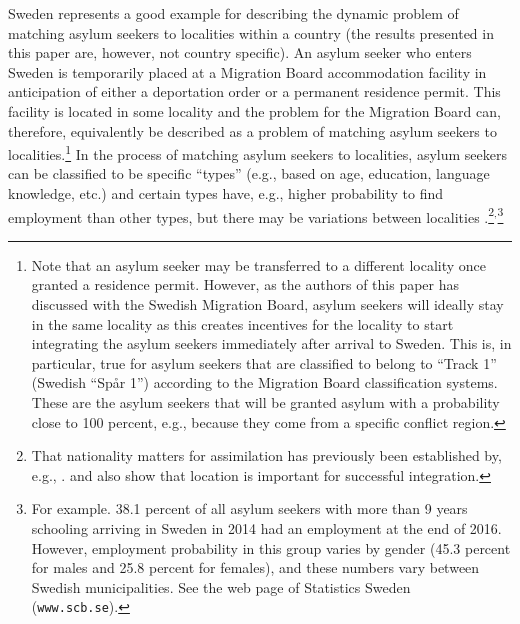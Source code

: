 \documentclass[12pt,fleqn]{article}
\begin{document}
Sweden represents a good example for describing the dynamic problem of matching asylum seekers to localities within a country (the results presented in this paper are, however, not country specific). An asylum seeker who enters Sweden is temporarily placed at a Migration Board accommodation facility in anticipation of either a deportation order or a permanent residence permit. This facility is located in some locality and the problem for the Migration Board can, therefore, equivalently be described as a problem of matching asylum seekers to localities.\footnote{Note that an asylum seeker may be transferred to a different locality once granted a residence permit. However, as the authors of this paper has discussed with the Swedish Migration Board, asylum seekers will ideally stay in the same locality as this creates incentives for the locality to start integrating the asylum seekers immediately after arrival to Sweden. This is, in particular, true for asylum seekers that are classified to belong to ``Track 1'' (Swedish ``Sp\aa r 1'') according to the Migration Board classification systems. These are the asylum seekers that will be granted asylum with a probability close to 100 percent, e.g., because they come from a specific conflict region.} In the process of matching asylum seekers to localities, asylum seekers can be classified to be specific ``types'' (e.g., based on age, education, language knowledge, etc.) and certain types have, e.g., higher probability to find employment than other types, but there may be variations between localities \citep{bib:BansakEtAl}.\footnote{That nationality matters for assimilation has previously been established by, e.g., \citet{bib:RanEtAl}. \citet{bib:EdinEtAl} and \citet{bib:Damm} also show that location is important for successful integration.}$^{,}$\footnote{For example. 38.1 percent of all asylum seekers with more than 9 years schooling arriving in Sweden in 2014 had an employment at the end of 2016. However, employment probability in this group varies by gender (45.3 percent for males and 25.8 percent for females), and these numbers vary between Swedish municipalities. See the web page of Statistics Sweden (\texttt{www.scb.se}).}
\end{document}
